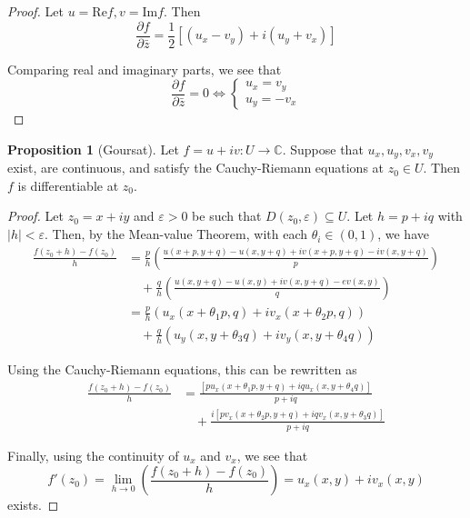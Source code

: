 \documentclass[10pt,fleqn]{article}
\newcommand{\comps}{\mathbb{C}}
\newcommand{\eps}{\varepsilon}
\newcommand{\re}{\mathrm{Re}}
\newcommand{\im}{\mathrm{Im}}
\theoremstyle{definition} \newtheorem{defn}{Definition}[section]
\theoremstyle{plain}      \newtheorem{thm}[defn]{Theorem}
\theoremstyle{definition} \newtheorem{prop}[defn]{Proposition}
\theoremstyle{plain}      \newtheorem{lem}[defn]{Lemma}
\theoremstyle{definition} \newtheorem{cor}[defn]{Corollary}
\theoremstyle{definition} \newtheorem{ex}[defn]{Example}
\theoremstyle{definition} \newtheorem{rem}[defn]{Remark}
\begin{document}
\begin{proof}
    Let $u=\re f,v=\im f$.
    Then
    \[
        \frac{\partial f}{\partial\bar{z}}=
        \frac{1}{2}[(u_x-v_y)+i(u_y+v_x)]
    \]

    Comparing real and imaginary parts, we see that
    \[
        \frac{\partial f}{\partial\bar{z}}=0\Longleftrightarrow
        \left\{
        \begin{array}{l}
            u_x = v_y\\
            u_y = -v_x
        \end{array}
        \right.
    \]
\end{proof}

\begin{prop}[Goursat]
    Let $f=u+iv:U\to\comps$.
    Suppose that $u_x,u_y,v_x,v_y$ exist, are continuous, and satisfy the Cauchy-Riemann equations at $z_0\in U$.
    Then $f$ is differentiable at $z_0$.
\end{prop}

\begin{proof}
    Let $z_0=x+iy$ and $\eps>0$ be such that $D(z_0,\eps)\subseteq U$.
    Let $h=p+iq$ with $|h|<\eps$.
    Then, by the Mean-value Theorem, with each $\theta_i\in(0,1)$, we have
    \begin{align*}
        \frac{f(z_0+h)-f(z_0)}{h}
        &=
        \frac{p}{h}\left(\frac{u(x+p,y+q)-u(x,y+q)+iv(x+p,y+q)-iv(x,y+q)}{p}\right)\\
        &\quad+
        \frac{q}{h}\left(\frac{u(x,y+q)-u(x,y)+iv(x,y+q)-ev(x,y)}{q}\right)\\
        &=
        \frac{p}{h}(u_x(x+\theta_1p,q)+iv_x(x+\theta_2p,q))\\
        &\quad+
        \frac{q}{h}(u_y(x,y+\theta_3q)+iv_y(x,y+\theta_4q))
    \end{align*}

    Using the Cauchy-Riemann equations, this can be rewritten as
    \begin{align*}
        \frac{f(z_0+h)-f(z_0)}{h}
        &=
        \frac{[pu_x(x+\theta_1p,y+q)+iqu_x(x,y+\theta_4q)]}{p+iq}\\
        &\quad+
        \frac{i[pv_x(x+\theta_2p,y+q)+iqv_x(x,y+\theta_3q)]}{p+iq}
    \end{align*}

    Finally, using the continuity of $u_x$ and $v_x$, we see that
    \[
        f'(z_0)=
        \lim_{h\to0}\left(\frac{f(z_0+h)-f(z_0)}{h}\right)=
        u_x(x,y)+iv_x(x,y)
    \]
    exists.
\end{proof}
\end{document}
